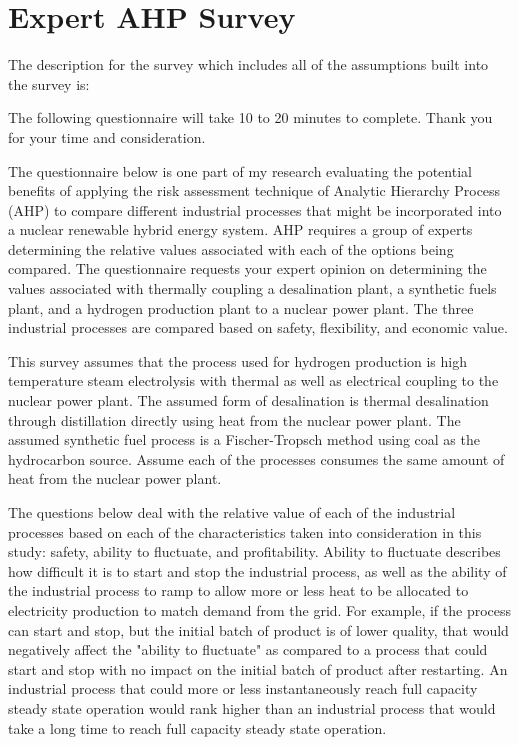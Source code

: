 \documentclass[12pt]{UIdahoMastersThesis}
\begin{document}
\clearpage
\appendix  %
\chapter{Expert AHP Survey}

The description for the survey which includes all of the assumptions built into the survey is:

The following questionnaire will take 10 to 20 minutes to complete. Thank you for your time and consideration.

The questionnaire below is one part of my research evaluating the potential benefits of applying the risk assessment technique of Analytic Hierarchy Process (AHP) to compare different industrial processes that might be incorporated into a nuclear renewable hybrid energy system.  AHP requires a group of experts determining the relative values associated with each of the options being compared.  The questionnaire  requests your expert opinion on determining the values associated with thermally coupling a desalination plant, a synthetic fuels plant, and a hydrogen production plant to a nuclear power plant.  The three industrial processes are compared based on safety, flexibility, and economic value.

This survey assumes that the process used for hydrogen production is high temperature steam electrolysis with thermal as well as electrical coupling to the nuclear power plant.  The assumed form of desalination is thermal desalination through distillation directly using heat from the nuclear power plant.  The assumed synthetic fuel process is a Fischer-Tropsch method using coal as the hydrocarbon source.  Assume each of the processes consumes the same amount of heat from the nuclear power plant.

The questions below deal with the relative value of each of the industrial processes based on each of the characteristics taken into consideration in this study: safety, ability to fluctuate, and profitability. Ability to fluctuate describes how difficult it is to start and stop the industrial process, as well as the ability of the industrial process to ramp to allow more or less heat to be allocated to electricity production to match demand from the grid. For example, if the process can start and stop, but the initial batch of product is of lower quality, that would negatively affect the "ability to fluctuate" as compared to a process that could start and stop with no impact on the initial batch of product after restarting.  An industrial process that could more or less instantaneously reach full capacity steady state operation would rank higher than an industrial process that would take a long time to reach full capacity steady state operation.
\end{document}
